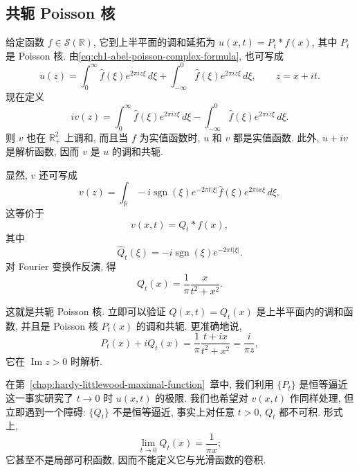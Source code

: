 \hypertarget{chapter-03-page-061}{}
\subsection{共轭 Poisson 核}
\label{sec:ch3-conjugate-poisson-kernel}

给定函数 $f\in\mathcal S(\mathbb R)$, 它到上半平面的调和延拓为 $u(x,t)=P_t*f(x)$, 其中 $P_t$ 是 Poisson 核. 由\eqref{eq:ch1-abel-poisson-complex-formula}, 也可写成
\[
 u(z)=\int_0^\infty \widehat f(\xi)e^{2\pi iz\xi}\,d\xi
      +\int_{-\infty}^0 \widehat f(\xi)e^{2\pi i\bar z\xi}\,d\xi,
 \qquad z=x+it.
\]
现在定义
\[
 iv(z)=\int_0^\infty \widehat f(\xi)e^{2\pi iz\xi}\,d\xi
      -\int_{-\infty}^0 \widehat f(\xi)e^{2\pi i\bar z\xi}\,d\xi.
\]
则 $v$ 也在 $\mathbb R_+^2$ 上调和, 而且当 $f$ 为实值函数时, $u$ 和 $v$ 都是实值函数. 此外, $u+iv$ 是解析函数, 因而 $v$ 是 $u$ 的调和共轭.

显然, $v$ 还可写成
\[
 v(z)=\int_{\mathbb R}-i\operatorname{sgn}(\xi)e^{-2\pi t|\xi|}
       \widehat f(\xi)e^{2\pi ix\xi}\,d\xi,
\]
这等价于
\begin{equation}
\label{eq:ch3-conjugate-poisson-convolution}
 v(x,t)=Q_t*f(x),
\end{equation}
其中
\begin{equation}
\label{eq:ch3-conjugate-poisson-fourier}
 \widehat Q_t(\xi)=-i\operatorname{sgn}(\xi)e^{-2\pi t|\xi|}.
\end{equation}
对 Fourier 变换作反演, 得
\begin{equation}
\label{eq:ch3-conjugate-poisson-kernel}
 Q_t(x)=\frac{1}{\pi}\frac{x}{t^2+x^2}.
\end{equation}

\hypertarget{chapter-03-page-062}{}
这就是共轭 Poisson 核. 立即可以验证 $Q(x,t)=Q_t(x)$ 是上半平面内的调和函数, 并且是 Poisson 核 $P_t(x)$ 的调和共轭. 更准确地说,
\[
 P_t(x)+iQ_t(x)=\frac{1}{\pi}\frac{t+ix}{t^2+x^2}=\frac{i}{\pi z},
\]
它在 $\operatorname{Im}z>0$ 时解析.

在第~\ref{chap:hardy-littlewood-maximal-function}~章中, 我们利用 $\{P_t\}$ 是恒等逼近这一事实研究了 $t\to0$ 时 $u(x,t)$ 的极限. 我们也希望对 $v(x,t)$ 作同样处理, 但立即遇到一个障碍: $\{Q_t\}$ 不是恒等逼近, 事实上对任意 $t>0$, $Q_t$ 都不可积. 形式上,
\[
 \lim_{t\to0}Q_t(x)=\frac{1}{\pi x};
\]
它甚至不是局部可积函数, 因而不能定义它与光滑函数的卷积.
